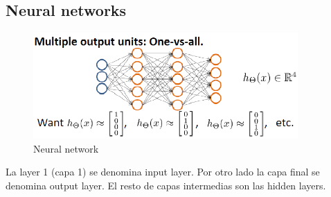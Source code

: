 \documentclass[12pt,a4paper]{article}
\begin{document}
\subsection{Neural networks}
\begin{figure}[htb]
\center
\includegraphics[width=0.9\textwidth]{neural_network}
\caption{Neural network}
\end{figure}
La layer 1 (capa 1) se denomina input layer. Por otro lado la capa final se denomina output layer. El resto de capas intermedias son las hidden layers.
\end{document}
